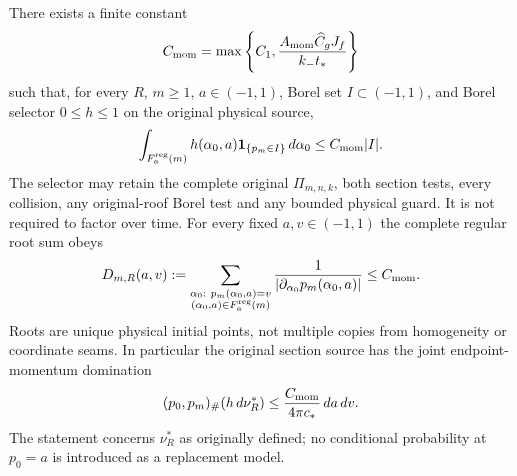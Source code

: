 \begin{theorem}
\label{thm:mc-kernel}
There exists a finite constant
\begin{equation}\label{eq:mc-C}
 C_{\rm mom}=\max\left\{C_1,
             \frac{A_{\rm mom}\widehat C_gJ_f}{k_-t_*}\right\}
\end{equation}
such that, for every $R$, $m\ge1$, $a\in(-1,1)$, Borel set
$I\subset(-1,1)$, and Borel selector $0\le h\le1$ on the original
physical source,
\begin{equation}\label{eq:mc-kernel}
 \int_{F_a^{\rm reg}(m)}h(\alpha_0,a)
              \mathbf1_{\{p_m\in I\}}\,d\alpha_0
       \le C_{\rm mom}|I|.
\end{equation}
The selector may retain the complete original $\Pi_{m,n,k}$, both
section tests, every collision, any original-roof Borel test and any
bounded physical guard. It is not required to factor over time.
For every fixed $a,v\in(-1,1)$ the complete regular root sum obeys
\begin{equation}\label{eq:mc-roots}
 D_{m,R}(a,v):=
 \sum_{\substack{\alpha_0:\ p_m(\alpha_0,a)=v\\
                         (\alpha_0,a)\in F_a^{\rm reg}(m)}}
   \frac1{|\partial_{\alpha_0}p_m(\alpha_0,a)|}
          \le C_{\rm mom}.
\end{equation}
Roots are unique physical initial points, not multiple copies from
homogeneity or coordinate seams. In particular the original section
source has the joint endpoint-momentum domination
\begin{equation}\label{eq:mc-joint}
 (p_0,p_m)_\#(h\,d\nu_R^*)
       \le\frac{C_{\rm mom}}{4\pi c_*}\,da\,dv.
\end{equation}
The statement concerns $\nu_R^*$ as originally defined; no conditional
probability at $p_0=a$ is introduced as a replacement model.
\end{theorem}
